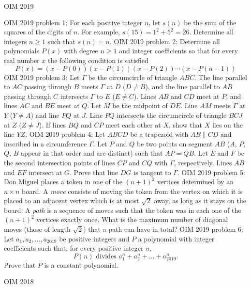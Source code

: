 OIM 2019 

OIM 2019 problem 1:  For each positive integer $n$, let $s(n)$ be the sum of the squares of the digits of $n$. For example, $s(15)=1^2+5^2=26$. Determine all integers $n\geq 1$ such that $s(n)=n$. 
OIM 2019 problem 2:  Determine all polynomials $P(x)$ with degree $n\geq 1$ and integer coefficients so that for every real number $x$ the following condition is satisfied
\[ P(x)=(x-P(0))(x-P(1))(x-P(2))\cdots (x-P(n-1)) \] 
OIM 2019 problem 3:  Let $\Gamma$ be the circumcircle of triangle $ABC$. The line parallel to $AC$ passing through $B$ meets $\Gamma$ at $D$ ($D\neq B$), and the line parallel to $AB$ passing through $C$ intersects $\Gamma$ to $E$ ($E\neq C$). Lines $AB$ and $CD$ meet at $P$, and lines $AC$ and $BE$ meet at $Q$. Let $M$ be the midpoint of $DE$. Line $AM$ meets $\Gamma$ at $Y$ ($Y\neq A$) and line $PQ$ at $J$. Line $PQ$ intersects the circumcircle of triangle $BCJ$ at $Z$ ($Z\neq J$). If lines $BQ$ and $CP$ meet each other at $X$, show that $X$ lies on the line $YZ$. 
OIM 2019 problem 4:  Let $ABCD$ be a trapezoid with $AB\parallel CD$ and inscribed in a circumference $\Gamma$. Let $P$ and $Q$ be two points on segment $AB$ ($A$, $P$, $Q$, $B$ appear in that order and are distinct) such that $AP=QB$. Let $E$ and $F$ be the second intersection points of lines $CP$ and $CQ$ with $\Gamma$, respectively. Lines $AB$ and $EF$ intersect at $G$. Prove that line $DG$ is tangent to $\Gamma$. 
OIM 2019 problem 5:  Don Miguel places a token in one of the $(n+1)^2$ vertices determined by an $n \times n$ board. A \textit{move} consists of moving the token from the vertex on which it is placed to an adjacent vertex which is at most $\sqrt2$ away, as long as it stays on the board. A \textit{path} is a sequence of moves such that the token was in each one of the $(n+1)^2$ vertices exactly once. What is the maximum number of diagonal moves (those of length $\sqrt2$) that a path can have in total? 
OIM 2019 problem 6:  Let $a_1, a_2, \dots, a_{2019}$ be positive integers and $P$ a polynomial with integer coefficients such that, for every positive integer $n$,
\[ P(n) \text{ divides  } a_1^n+a_2^n+\dots+a_{2019}^n. \]
Prove that $P$ is a constant polynomial. 

OIM 2018 

